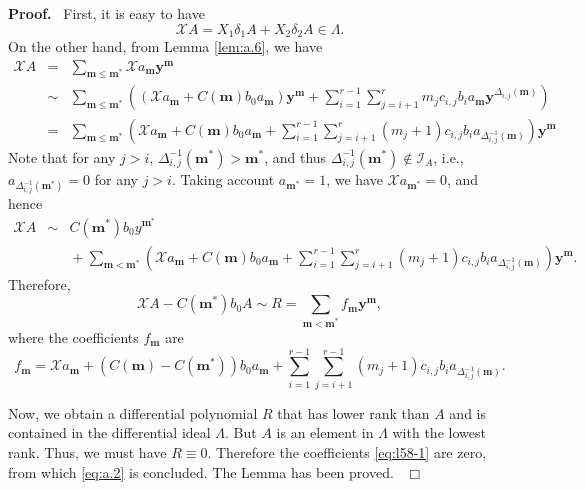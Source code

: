 \documentclass[preprint,12pt]{elsarticle}
\newenvironment{proof}[1][Proof]{\textbf{#1.}\ }{\ $\Box$}
\begin{document}
\begin{proof}
First, it is easy to have 
$$\mathscr{X}A = X_1 \delta_1A + X_2 \delta_2 A \in \Lambda.$$ 
On the other hand, from Lemma \ref{lem:a.6}, we have
\begin{eqnarray*}
\mathscr{X}A&=&\sum_{\mathbf{m}\leq \mathbf{m}^*}\mathscr{X}a_{\mathbf{m}}\mathbf{y}^{\mathbf{m}}\\
&\sim&\sum_{\mathbf{m}\leq \mathbf{m}^*}\left((\mathscr{X}a_{\mathbf{m}} +
C({\mathbf{m}})b_0a_{\mathbf{m}})\mathbf{y}^{\mathbf{m}}  +
\sum_{i=1}^{r-1}\sum_{j = i+1}^{r}m_jc_{i,j} b_i a_{\mathbf{m}}\mathbf{y}^{\Delta_{i,j}(\mathbf{m})}\right)\\
&=&\sum_{\mathbf{m}\leq \mathbf{m}^*}\left(\mathscr{X}a_{\mathbf{m}} +
C({\mathbf{m}})b_0a_{\mathbf{m}} + \sum_{i=1}^{r-1}\sum_{j =
i+1}^{r}(m_j+1)c_{i,j}b_ia_{{\Delta_{i,j}^{-1}}(\mathbf{m})}\right)\mathbf{y}^{\mathbf{m}}
\end{eqnarray*}
Note that for any $j>i$, $\Delta_{i,j}^{-1}(\mathbf{m}^*) > \mathbf{m}^*$,  and
thus $\Delta_{i,j}^{-1}(\mathbf{m}^*) \not\in \mathcal{I}_A$, i.e., $a_{\Delta_{i,j}^{-1}(\mathbf{m}^*)}
= 0$ for any $j>i$. Taking account $a_{\mathbf{m}^*} = 1$, we have $\mathscr{X}a_{\mathbf{m}^*} =0$, and hence
\begin{eqnarray*}
\mathscr{X}A &\sim& C(\mathbf{m}^*)b_0 y^{\mathbf{m}^*} \\
&&{} +  \sum_{\mathbf{m}<\mathbf{m}^*}\left(\mathscr{X}a_{\mathbf{m}} +
C({\mathbf{m}})b_0a_{\mathbf{m}} + \sum_{i=1}^{r-1}\sum_{j =
i+1}^{r}(m_j+1)c_{i,j}b_ia_{{\Delta_{i,j}^{-1}}(\mathbf{m})}\right)\mathbf{y}^{\mathbf{m}}.
\end{eqnarray*}
Therefore, 
\begin{equation}
\label{eq:l58}
\mathscr{X}A - C({\mathbf{m}^*})b_0A  \sim R = \sum_{\mathbf{m} < \mathbf{m}^*} f_{\mathbf{m}} \mathbf{y}^{\mathbf{m}}, 
\end{equation}
where the coefficients $f_{\mathbf{m}}$ are
\begin{equation}
\label{eq:l58-1}
f_{\mathbf{m}} =  \mathscr{X}a_\mathbf{m}
+ (C({\mathbf{m}}) - C({\mathbf{m}^*}))b_0a_{\mathbf{m}} +
\sum_{i=1}^{r-1}\sum_{j=i+1}^{r-1}(m_j+1)c_{i,j}b_ia_{{\Delta_{i,j}^{-1}}(\mathbf{m})}.
\end{equation}

Now, we obtain a differential polynomial $R$ that has lower rank than $A$ and is contained in the differential ideal
$\Lambda$. But $A$ is an element in $\Lambda$ with the lowest rank. Thus, we must have  
$R\equiv 0$. Therefore the coefficients \eqref{eq:l58-1} are zero, from which  \eqref{eq:a.2} is concluded. The Lemma has been proved.
\end{proof}
\end{document}
